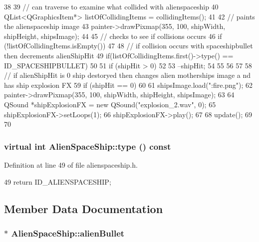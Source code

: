 \begin{DoxyCode}
38 {
39     // can traverse to examine what collided with alienspaceship
40     QList<QGraphicsItem*> listOfCollidingItems = collidingItems();
41 
42     // paints the alienspaceship image
43     painter->drawPixmap(355, 100, shipWidth, shipHeight, shipsImage);
44 
45     // checks to see if collisions occurs
46     if (!listOfCollidingItems.isEmpty())
47     {
48         // if collision occurs with spaceshipbullet then decrements alienShipHit
49         if(listOfCollidingItems.first()->type() == ID_SPACESHIPBULLET)
50         {
51             if (shipHit > 0)
52             {
53                --shipHit;
54             }
55         }
56     }
57 
58     // if alienShipHit is 0 ship destoryed then changes alien motherships image a
      nd has ship explosion FX
59     if (shipHit == 0)
60     {
61        shipsImage.load(":fire.png");
62        painter->drawPixmap(355, 100, shipWidth, shipHeight, shipsImage);
63 
64        QSound *shipExplosionFX = new QSound("explosion_2.wav", 0);
65        shipExplosionFX->setLoops(1);
66        shipExplosionFX->play();
67 
68        update(); 
69     }
70 }
\end{DoxyCode}
\hypertarget{class_alien_space_ship_aabf0179043ef296560f15e88d4da386c}{
\subsubsection[{type}]{\setlength{\rightskip}{0pt plus 5cm}virtual int AlienSpaceShip::type () const}}
\label{class_alien_space_ship_aabf0179043ef296560f15e88d4da386c}


Definition at line 49 of file alienspaceship.h.


\begin{DoxyCode}
49 {return ID_ALIENSPACESHIP; }
\end{DoxyCode}


\subsection{Member Data Documentation}
\hypertarget{class_alien_space_ship_a9b5c9dec5c5a39242d75725560e63811}{
\subsubsection[{alienBullet}]{$\ast$ {\bf AlienSpaceShip::alienBullet}}}
\label{class_alien_space_ship_a9b5c9dec5c5a39242d75725560e63811}


